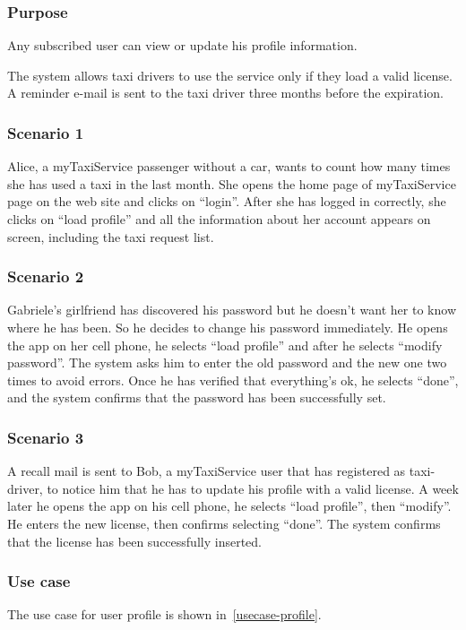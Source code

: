 \label{user-profile}
\subsubsection{Purpose}
Any subscribed user can view or update his profile information. 

The system allows taxi drivers to use the service only if they load a valid license. A reminder e-mail is sent to the taxi driver three months before the expiration. 


\subsubsection{Scenario 1}
Alice, a myTaxiService passenger without a car, wants to count how many times she has used a taxi in the last month.
She opens the home page of myTaxiService page on the web site and clicks on ``login''. 
After she has logged in correctly, she clicks on ``load profile'' and all the information about her account appears on screen, including the taxi request list. 

\subsubsection{Scenario 2}
Gabriele's girlfriend has discovered his password but he doesn't want her to know where he has been. So he decides to change his password immediately. He opens the app on her cell phone, he selects ``load profile'' and after he selects ``modify password''. The system asks him to enter the old password and the new one two times to avoid errors. Once he has verified that everything's ok, he selects ``done'', and the system confirms that the password has been successfully set.

\subsubsection{Scenario 3}
A recall mail is sent to Bob, a myTaxiService user that has registered as taxi-driver, to notice him that he has to update his profile with a valid license. A week later he opens the app on his cell phone, he selects ``load profile'', then ``modify''. He enters the new license, then confirms selecting ``done''. The system confirms that the license has been successfully inserted.


\subsubsection{Use case}
The use case for user profile is shown in~\autoref{usecase-profile}.

